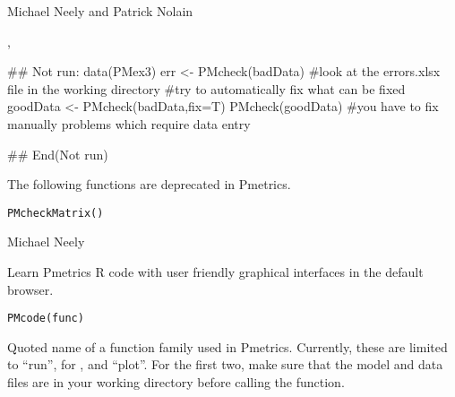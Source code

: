 \documentclass[a4paper]{book}
\begin{document}
%
\begin{Author}\relax
Michael Neely and Patrick Nolain
\end{Author}
%
\begin{SeeAlso}\relax
{}, 
\end{SeeAlso}
%
\begin{Examples}
\begin{ExampleCode}
## Not run: 
data(PMex3)
err <- PMcheck(badData)
#look at the errors.xlsx file in the working directory
#try to automatically fix what can be fixed
goodData <- PMcheck(badData,fix=T)
PMcheck(goodData)
#you have to fix manually problems which require data entry

## End(Not run)
\end{ExampleCode}
\end{Examples}
%
\begin{Description}\relax
The following functions are deprecated in Pmetrics.
\end{Description}
%
\begin{Usage}
\begin{verbatim}
PMcheckMatrix()
\end{verbatim}
\end{Usage}
%
\begin{Author}\relax
Michael Neely
\end{Author}
%
\begin{Description}\relax
Learn Pmetrics R code with user friendly graphical interfaces in the default browser.
\end{Description}
%
\begin{Usage}
\begin{verbatim}
PMcode(func)
\end{verbatim}
\end{Usage}
%
\begin{Arguments}
\begin{ldescription}
\item[\code{func}] Quoted name of a function family used in Pmetrics.  Currently, these are limited to ``run'', 
for ,  and ``plot''.  For the first two, make sure that the model and data files are in your
working directory before calling the function.
\end{ldescription}
\end{Arguments}
\end{document}
